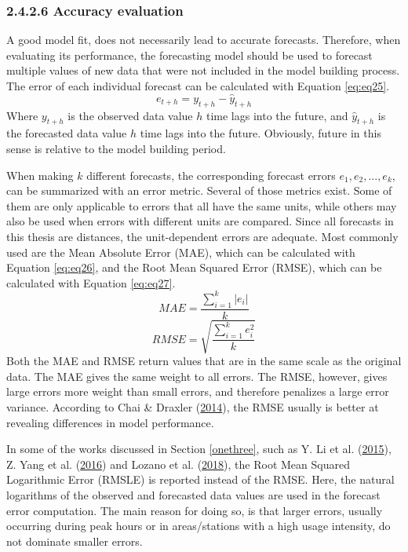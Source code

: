 \documentclass[12pt,oneside]{reedthesis}
\begin{document}
\subsubsection{2.4.2.6 Accuracy evaluation}\label{twofourtwosix}

A good model fit, does not necessarily lead to accurate forecasts.
Therefore, when evaluating its performance, the forecasting model should
be used to forecast multiple values of new data that were not included
in the model building process. The error of each individual forecast can
be calculated with Equation \eqref{eq:eq25}.
\begin{equation}
e_{t+h} = y_{t+h} - \hat{y}_{t+h}
\label{eq:eq25}
\end{equation}
Where \(y_{t+h}\) is the observed data value \(h\) time lags into the
future, and \(\hat{y}_{t+h}\) is the forecasted data value \(h\) time
lags into the future. Obviously, future in this sense is relative to the
model building period.

When making \(k\) different forecasts, the corresponding forecast errors
\(e_{1}, e_{2}, ..., e_{k}\), can be summarized with an error metric.
Several of those metrics exist. Some of them are only applicable to
errors that all have the same units, while others may also be used when
errors with different units are compared. Since all forecasts in this
thesis are distances, the unit-dependent errors are adequate. Most
commonly used are the Mean Absolute Error (MAE), which can be calculated
with Equation \eqref{eq:eq26}, and the Root Mean Squared Error (RMSE),
which can be calculated with Equation \eqref{eq:eq27}.
\begin{equation}
MAE = \frac{\sum_{i = 1}^k |e_{i}|}{k}
\label{eq:eq26}
\end{equation}\begin{equation}
RMSE = \sqrt{\frac{\sum_{i = 1}^k e_{i}^{2}}{k}}
\label{eq:eq27}
\end{equation}
Both the MAE and RMSE return values that are in the same scale as the
original data. The MAE gives the same weight to all errors. The RMSE,
however, gives large errors more weight than small errors, and therefore
penalizes a large error variance. According to Chai \& Draxler
(\protect\hyperlink{ref-chai2014}{2014}), the RMSE usually is better at
revealing differences in model performance.

In some of the works discussed in Section \ref{onethree}, such as Y. Li
et al. (\protect\hyperlink{ref-li2015}{2015}), Z. Yang et al.
(\protect\hyperlink{ref-yang2016}{2016}) and Lozano et al.
(\protect\hyperlink{ref-lozano2018}{2018}), the Root Mean Squared
Logarithmic Error (RMSLE) is reported instead of the RMSE. Here, the
natural logarithms of the observed and forecasted data values are used
in the forecast error computation. The main reason for doing so, is that
larger errors, usually occurring during peak hours or in areas/stations
with a high usage intensity, do not dominate smaller errors.
\end{document}
